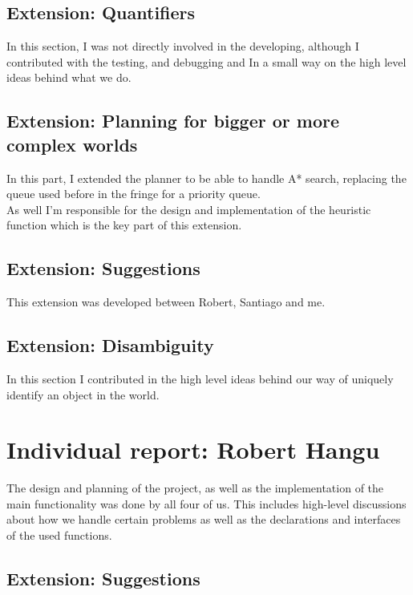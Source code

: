 \documentclass[11pt]{article}
\begin{document}
\subsection{Extension: Quantifiers}
In this section, I was not directly involved in the developing, although I 
contributed with the testing, and debugging and In a small way on the high 
level ideas behind what we do.  \\

\subsection{Extension: Planning for bigger or more complex worlds}

In this part, I extended the planner to be able to handle A* search, replacing 
the queue used before in the fringe for a priority queue.  \\

As well I'm responsible for the design and implementation of the heuristic 
function which is the key part of this extension.  \\

\subsection{Extension: Suggestions}

This extension was developed between Robert, Santiago and me.  \\

\subsection{Extension: Disambiguity}

In this section I contributed in the high level ideas behind our way of 
uniquely identify an object in the world.  \\

\section{Individual report: Robert Hangu}

The design and planning of the project, as well as the implementation of 
the main functionality was done by all four of us. This includes high-level 
discussions about how we handle certain problems as well as the declarations 
and interfaces of the used functions.

\subsection{Extension: Suggestions}
\end{document}
